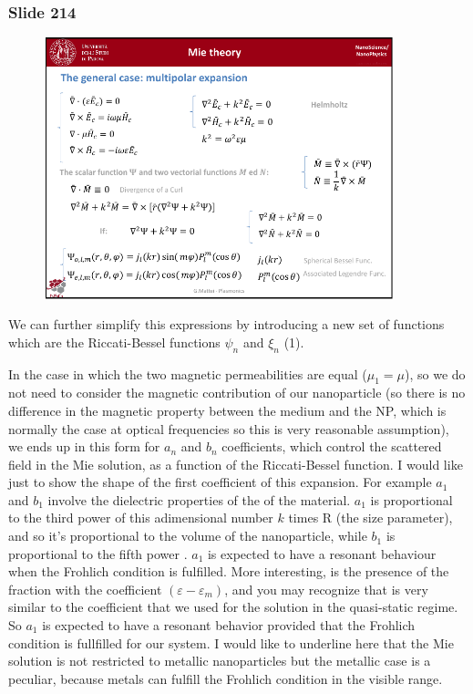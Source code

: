 \documentclass[../main/main.tex]{subfiles}
\begin{document}
\newpage

\subsubsection{Slide 214}

\begin{figure}[h!]
\centering
\includegraphics[page=7,width=0.9\textwidth]{../lessons/pdf_file/13_lesson.pdf}
\end{figure}

We can further simplify this expressions by introducing a new set of functions which are the Riccati-Bessel functions \( \psi _n \) and \( \xi _n \) (1).

In the case in which the two magnetic permeabilities are equal (\( \mu _1 = \mu  \)), so we do not need to consider the magnetic contribution of our nanoparticle (so there is no difference in the magnetic property between the medium and the NP, which is normally the case at optical frequencies so this is very reasonable assumption), we ends up in this form for $a_n$ and $b_n$ coefficients, which control the scattered field in the Mie solution, as a function of the Riccati-Bessel function.
I would like just to show the shape of the first coefficient of this expansion.
For example $a_1$ and $b_1$  involve the dielectric properties of the of the material.  $a_1$  is proportional to the third power of this adimensional number $k$ times R (the size parameter), and so it’s proportional to the volume of the nanoparticle, while $b_1$ is proportional to the fifth power .
$a_1$  is expected to have a resonant behaviour when the Frohlich condition is fulfilled.
More interesting, is the presence of the fraction with the coefficient \( (\varepsilon - \varepsilon _m) \), and you may recognize that is very similar to the coefficient that we used for the solution in the quasi-static regime. So \( a_1 \) is expected to have a resonant behavior provided that the Frohlich condition is fullfilled for our system.
I would like to underline here that the Mie solution is not restricted to metallic nanoparticles but the metallic case is a peculiar, because metals can fulfill the Frohlich condition  in the visible range.
\end{document}
